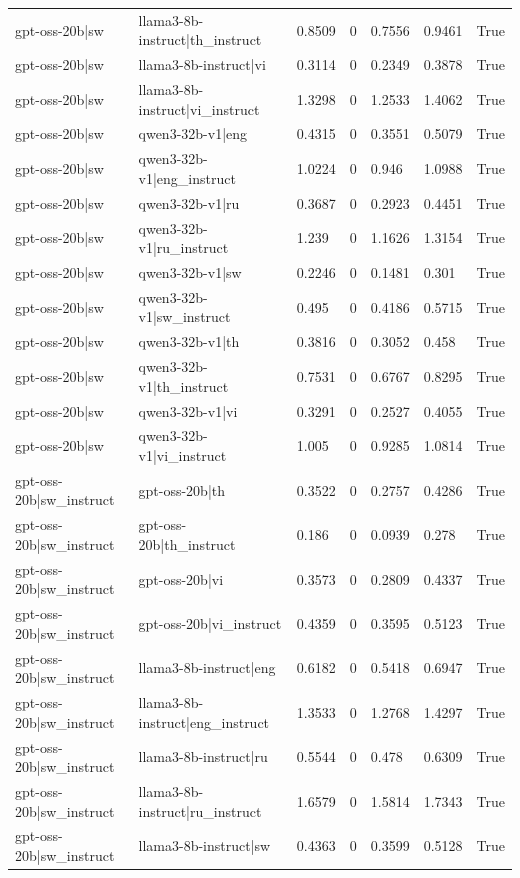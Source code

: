 \begin{table}
\begin{tabular}{llllllr}
gpt-oss-20b|sw & llama3-8b-instruct|th_instruct & 0.8509 & 0 & 0.7556 & 0.9461 & True \\
gpt-oss-20b|sw & llama3-8b-instruct|vi & 0.3114 & 0 & 0.2349 & 0.3878 & True \\
gpt-oss-20b|sw & llama3-8b-instruct|vi_instruct & 1.3298 & 0 & 1.2533 & 1.4062 & True \\
gpt-oss-20b|sw & qwen3-32b-v1|eng & 0.4315 & 0 & 0.3551 & 0.5079 & True \\
gpt-oss-20b|sw & qwen3-32b-v1|eng_instruct & 1.0224 & 0 & 0.946 & 1.0988 & True \\
gpt-oss-20b|sw & qwen3-32b-v1|ru & 0.3687 & 0 & 0.2923 & 0.4451 & True \\
gpt-oss-20b|sw & qwen3-32b-v1|ru_instruct & 1.239 & 0 & 1.1626 & 1.3154 & True \\
gpt-oss-20b|sw & qwen3-32b-v1|sw & 0.2246 & 0 & 0.1481 & 0.301 & True \\
gpt-oss-20b|sw & qwen3-32b-v1|sw_instruct & 0.495 & 0 & 0.4186 & 0.5715 & True \\
gpt-oss-20b|sw & qwen3-32b-v1|th & 0.3816 & 0 & 0.3052 & 0.458 & True \\
gpt-oss-20b|sw & qwen3-32b-v1|th_instruct & 0.7531 & 0 & 0.6767 & 0.8295 & True \\
gpt-oss-20b|sw & qwen3-32b-v1|vi & 0.3291 & 0 & 0.2527 & 0.4055 & True \\
gpt-oss-20b|sw & qwen3-32b-v1|vi_instruct & 1.005 & 0 & 0.9285 & 1.0814 & True \\
gpt-oss-20b|sw_instruct & gpt-oss-20b|th & 0.3522 & 0 & 0.2757 & 0.4286 & True \\
gpt-oss-20b|sw_instruct & gpt-oss-20b|th_instruct & 0.186 & 0 & 0.0939 & 0.278 & True \\
gpt-oss-20b|sw_instruct & gpt-oss-20b|vi & 0.3573 & 0 & 0.2809 & 0.4337 & True \\
gpt-oss-20b|sw_instruct & gpt-oss-20b|vi_instruct & 0.4359 & 0 & 0.3595 & 0.5123 & True \\
gpt-oss-20b|sw_instruct & llama3-8b-instruct|eng & 0.6182 & 0 & 0.5418 & 0.6947 & True \\
gpt-oss-20b|sw_instruct & llama3-8b-instruct|eng_instruct & 1.3533 & 0 & 1.2768 & 1.4297 & True \\
gpt-oss-20b|sw_instruct & llama3-8b-instruct|ru & 0.5544 & 0 & 0.478 & 0.6309 & True \\
gpt-oss-20b|sw_instruct & llama3-8b-instruct|ru_instruct & 1.6579 & 0 & 1.5814 & 1.7343 & True \\
gpt-oss-20b|sw_instruct & llama3-8b-instruct|sw & 0.4363 & 0 & 0.3599 & 0.5128 & True \\

\end{tabular}
\end{table}

